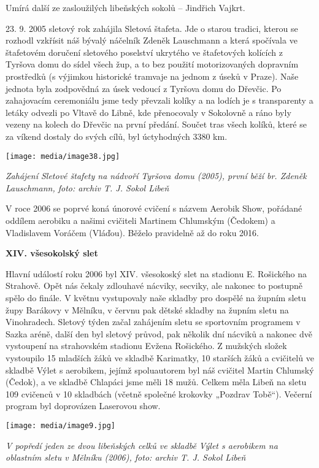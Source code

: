 Umírá další ze zasloužilých libeňských sokolů -- Jindřich Vajkrt.

23. 9. 2005 sletový rok zahájila Sletová štafeta. Jde o starou tradici,
kterou se rozhodl vzkřísit náš bývalý náčelník Zdeněk Lauschmann a která
spočívala ve štafetovém doručení sletového poselství ukrytého ve
štafetových kolících z Tyršova domu do sídel všech žup, a to bez použití
motorizovaných dopravním prostředků (s výjimkou historické tramvaje na
jednom z úseků v Praze). Naše jednota byla zodpovědná za úsek vedoucí z
Tyršova domu do Dřevčic. Po zahajovacím ceremoniálu jsme tedy převzali
kolíky a na lodích je s transparenty a letáky odvezli po Vltavě do
Libně, kde přenocovaly v Sokolovně a ráno byly vezeny na kolech do
Dřevčic na první předání. Součet tras všech kolíků, které se za víkend
dostaly do svých cílů, byl úctyhodných 3380 km.

\texttt{[image: media/image38.jpg]}

\emph{Zahájení Sletové štafety na nádvoří Tyršova domu (2005), první
běží br. Zdeněk Lauschmann, foto: archiv T. J. Sokol Libeň}

V roce 2006 se poprvé koná únorové cvičení s názvem Aerobik Show,
pořádané oddílem aerobiku a našimi cvičiteli Martinem Chlumským
(Čedokem) a Vladislavem Voráčem (Vláďou). Běželo pravidelně až do roku
2016.

\textbf{XIV. všesokolský slet}

Hlavní událostí roku 2006 byl XIV. všesokoský slet na stadionu E.
Rošického na Strahově. Opět nás čekaly zdlouhavé nácviky, secviky, ale
nakonec to postupně spělo do finále. V květnu vystupovaly naše skladby
pro dospělé na župním sletu župy Barákovy v Mělníku, v červnu pak dětské
skladby na župním sletu na Vinohradech. Sletový týden začal zahájením
sletu se sportovním programem v Sazka aréně, další den byl sletový
průvod, pak několik dní nácviků a nakonec dvě vystoupení na strahovském
stadionu Evžena Rošického. Z mužských složek vystoupilo 15 mladších žáků
ve skladbě Karimatky, 10 starších žáků a cvičitelů ve skladbě Výlet s
aerobikem, jejímž spoluautorem byl náš cvičitel Martin Chlumský (Čedok),
a ve skladbě Chlapáci jsme měli 18 mužů. Celkem měla Libeň na sletu 109
cvičenců v 10 skladbách (včetně společné krokovky „Pozdrav Tobě``).
Večerní program byl doprovázen Laserovou show.

\texttt{[image: media/image9.jpg]}

\emph{V popředí jeden ze dvou libeňských celků ve skladbě Výlet s
aerobikem na oblastním sletu v Mělníku (2006), foto: archiv T. J. Sokol
Libeň}

